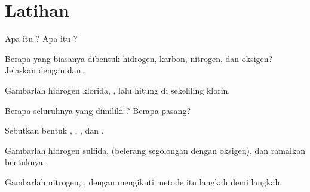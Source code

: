 \section{Latihan}

\begin{exercise}[$\star$]\label{exo:g10:lewis-and-shape:1}
Apa itu ? Apa itu ?
\end{exercise}

\begin{exercise}[$\star$]\label{exo:g10:lewis-and-shape:2}
Berapa  yang biasanya dibentuk hidrogen, karbon, nitrogen,
dan oksigen? Jelaskan dengan  dan .
\end{exercise}

\begin{exercise}[$\star$]\label{exo:g10:lewis-and-shape:3}
Gambarlah  hidrogen klorida, , lalu hitung
 di sekeliling klorin.
\end{exercise}

\begin{exercise}[$\star$]\label{exo:g10:lewis-and-shape:4}
Berapa  seluruhnya yang dimiliki  ?
Berapa pasang?
\end{exercise}

\begin{exercise}[$\star$]\label{exo:g10:lewis-and-shape:5}
Sebutkan bentuk , , , dan .
\end{exercise}

\begin{exercise}[$\star\star$]\label{exo:g10:lewis-and-shape:6}
Gambarlah  hidrogen sulfida,  (belerang segolongan
dengan oksigen), dan ramalkan bentuknya.
\end{exercise}

\begin{exercise}[$\star\star$]\label{exo:g10:lewis-and-shape:7}
Gambarlah  nitrogen, , dengan mengikuti metode itu
langkah demi langkah.
\end{exercise}

